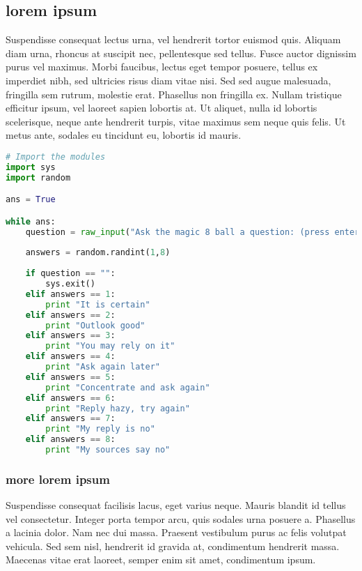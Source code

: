 \documentclass{jamk-thesis}
\begin{document}
\subsection{lorem ipsum}

Suspendisse consequat lectus urna, vel hendrerit tortor euismod quis. Aliquam
diam urna, rhoncus at suscipit nec, pellentesque sed tellus. Fusce auctor
dignissim purus vel maximus. Morbi faucibus, lectus eget tempor posuere, tellus
ex imperdiet nibh, sed ultricies risus diam vitae nisi. Sed sed augue
malesuada, fringilla sem rutrum, molestie erat.  Phasellus non fringilla ex.
Nullam tristique efficitur ipsum, vel laoreet sapien lobortis at. Ut aliquet,
nulla id lobortis scelerisque, neque ante hendrerit turpis, vitae maximus sem
neque quis felis. Ut metus ante, sodales eu tincidunt eu, lobortis id mauris.

\begin{lstlisting}[language=python, caption=Example code block]
# Import the modules
import sys
import random

ans = True

while ans:
    question = raw_input("Ask the magic 8 ball a question: (press enter to quit) ")
    
    answers = random.randint(1,8)
    
    if question == "":
        sys.exit()
    elif answers == 1:
        print "It is certain"
    elif answers == 2:
        print "Outlook good"
    elif answers == 3:
        print "You may rely on it"
    elif answers == 4:
        print "Ask again later"
    elif answers == 5:
        print "Concentrate and ask again"
    elif answers == 6:
        print "Reply hazy, try again"
    elif answers == 7:
        print "My reply is no"
    elif answers == 8:
        print "My sources say no"
\end{lstlisting}

\subsubsection{more lorem ipsum}

Suspendisse consequat facilisis lacus, eget varius neque. Mauris blandit id
tellus vel consectetur. Integer porta tempor arcu, quis sodales urna posuere a.
Phasellus a lacinia dolor. Nam nec dui massa. Praesent vestibulum purus ac
felis volutpat vehicula. Sed sem nisl, hendrerit id gravida at, condimentum
hendrerit massa.  Maecenas vitae erat laoreet, semper enim sit amet,
condimentum ipsum. \cite{singularity2}
\end{document}
